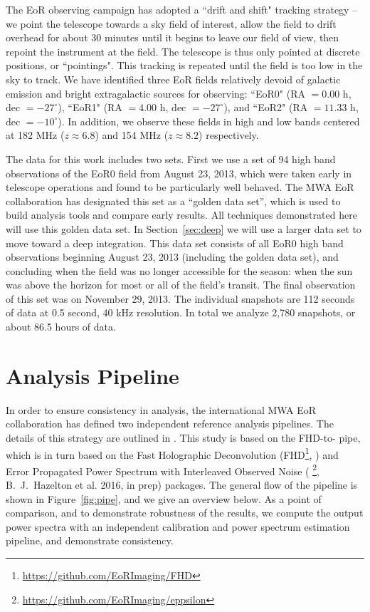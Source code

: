 \documentclass[iop]{emulateapj}
\begin{document}
The EoR observing campaign has adopted a ``drift and shift" tracking strategy -- we point 
the telescope towards a sky field of interest, allow the field to drift overhead for about 30 
minutes until it begins to leave our field of view, then repoint the instrument at the field. The 
telescope is thus only pointed at discrete positions, or ``pointings". This tracking is 
repeated until the field is too low in the sky to track. We have identified three EoR fields 
relatively devoid of galactic emission and bright extragalactic sources for observing: 
``EoR0" (RA $=0.00$ h, dec $= -27^\circ$), ``EoR1" (RA $=4.00$ h, dec $= -27^\circ$), 
and ``EoR2" (RA $=11.33$ h, dec $= -10^\circ$). In addition, we observe these fields in 
high and low bands centered at 182 MHz ($z\approx6.8$) and 154 MHz ($z\approx8.2$) 
respectively.

The data for this work includes two sets. First we use a set of 94 high band observations of 
the EoR0 field from August 23, 2013, which were taken early in telescope operations and 
found to be particularly well behaved. The MWA EoR collaboration has designated this set 
as a ``golden data set'', which is used to build analysis tools and compare early results. All 
techniques demonstrated here will use this golden data set. In Section~\ref{sec:deep} we 
will use a larger data set to move toward a deep integration. This data set consists of all 
EoR0 high band observations beginning August 23, 2013 (including the golden data set), 
and concluding when the field was no longer accessible for the season: when the sun was 
above the horizon for most or all of the field's transit. The final observation of this set was 
on November 29, 2013. The individual snapshots are 112 seconds of data at 0.5 second, 
40 kHz resolution. In total we analyze 2,780 snapshots, or about 86.5 hours of data.

\section{Analysis Pipeline}\label{sec:analysis}
In order to ensure consistency in analysis, the international MWA EoR collaboration has 
defined two independent reference analysis pipelines. The details of this strategy are 
outlined in \citealt{Jacobs:2016}. This study is based on the FHD-to-
\eppsilon pipe, which is in turn based on the Fast Holographic Deconvolution 
(FHD\footnote{\url{https://github.com/EoRImaging/FHD}}, \citealt{Sullivan:2012}) and Error 
Propagated Power Spectrum with Interleaved Observed Noise (\eppsilon
\footnote{\url{https://github.com/EoRImaging/eppsilon}}, B.~J.~Hazelton et al. 2016, in 
prep) packages. The general flow of the pipeline is shown in Figure~\ref{fig:pipe}, and we 
give an overview below. As a point of comparison, and to demonstrate robustness of the results, we compute the output power spectra with an independent calibration and power spectrum estimation pipeline, and demonstrate consistency.
\end{document}
